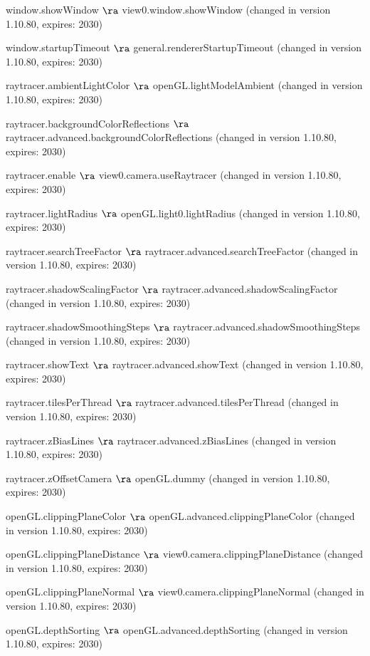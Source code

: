   \item window.showWindow $\ra$ view0.window.showWindow (changed in version 1.10.80, expires: 2030)
  \item window.startupTimeout $\ra$ general.rendererStartupTimeout (changed in version 1.10.80, expires: 2030)
  \item raytracer.ambientLightColor $\ra$ openGL.lightModelAmbient (changed in version 1.10.80, expires: 2030)
  \item raytracer.backgroundColorReflections $\ra$ raytracer.advanced.backgroundColorReflections (changed in version 1.10.80, expires: 2030)
  \item raytracer.enable $\ra$ view0.camera.useRaytracer (changed in version 1.10.80, expires: 2030)
  \item raytracer.lightRadius $\ra$ openGL.light0.lightRadius (changed in version 1.10.80, expires: 2030)
  \item raytracer.searchTreeFactor $\ra$ raytracer.advanced.searchTreeFactor (changed in version 1.10.80, expires: 2030)
  \item raytracer.shadowScalingFactor $\ra$ raytracer.advanced.shadowScalingFactor (changed in version 1.10.80, expires: 2030)
  \item raytracer.shadowSmoothingSteps $\ra$ raytracer.advanced.shadowSmoothingSteps (changed in version 1.10.80, expires: 2030)
  \item raytracer.showText $\ra$ raytracer.advanced.showText (changed in version 1.10.80, expires: 2030)
  \item raytracer.tilesPerThread $\ra$ raytracer.advanced.tilesPerThread (changed in version 1.10.80, expires: 2030)
  \item raytracer.zBiasLines $\ra$ raytracer.advanced.zBiasLines (changed in version 1.10.80, expires: 2030)
  \item raytracer.zOffsetCamera $\ra$ openGL.dummy (changed in version 1.10.80, expires: 2030)
  \item openGL.clippingPlaneColor $\ra$ openGL.advanced.clippingPlaneColor (changed in version 1.10.80, expires: 2030)
  \item openGL.clippingPlaneDistance $\ra$ view0.camera.clippingPlaneDistance (changed in version 1.10.80, expires: 2030)
  \item openGL.clippingPlaneNormal $\ra$ view0.camera.clippingPlaneNormal (changed in version 1.10.80, expires: 2030)
  \item openGL.depthSorting $\ra$ openGL.advanced.depthSorting (changed in version 1.10.80, expires: 2030)
